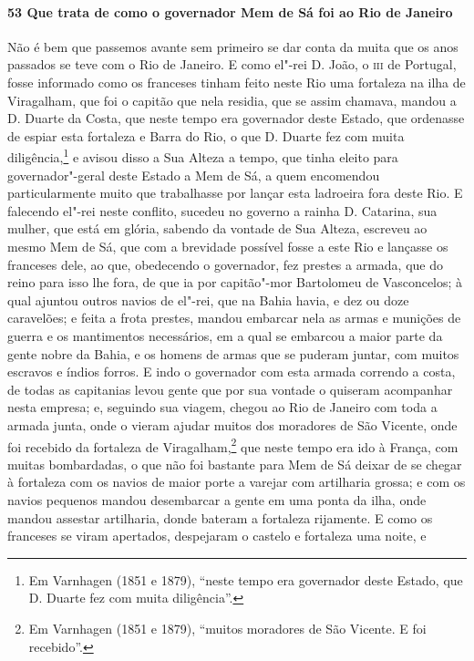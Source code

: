 \begin{linenumbers}
\paragraph{53 Que trata de como o governador Mem de Sá foi ao Rio de Janeiro} \quad
Não é bem que passemos avante sem primeiro se dar conta da muita que os anos passados se
teve com o Rio de Janeiro. E como el"-rei D. João, o \textsc{iii} de Portugal, fosse
informado como os franceses tinham feito neste Rio uma fortaleza na ilha de Viragalham,
que foi o capitão que nela residia, que se assim chamava, mandou a D. Duarte da Costa, que
neste tempo era governador deste Estado, que ordenasse de espiar esta fortaleza e Barra do
Rio, o que D. Duarte fez com muita diligência,\footnote{ Em Varnhagen (1851 e 1879),
``neste tempo era governador deste Estado, que D. Duarte fez com muita diligência''.} e
avisou disso a Sua Alteza a tempo, que tinha eleito para governador"-geral deste Estado a
Mem de Sá, a quem encomendou particularmente muito que trabalhasse por lançar esta
ladroeira fora deste Rio. E falecendo el"-rei neste conflito, sucedeu no governo a rainha
D. Catarina, sua mulher, que está em glória, sabendo da vontade de Sua Alteza, escreveu ao
mesmo Mem de Sá, que com a brevidade possível fosse a este Rio e lançasse os franceses
dele, ao que, obedecendo o governador, fez prestes a armada, que do reino para isso lhe
fora, de que ia por capitão"-mor Bartolomeu de Vasconcelos; à qual ajuntou outros navios de
el"-rei, que na Bahia havia, e dez ou doze caravelões; e feita a frota prestes, mandou
embarcar nela as armas e munições de guerra e os mantimentos necessários, em a qual se
embarcou a maior parte da gente nobre da Bahia, e os homens de armas que se puderam
juntar, com muitos escravos e índios forros. E indo o governador com esta armada correndo
a costa, de todas as capitanias levou gente que por sua vontade o quiseram acompanhar
nesta empresa; e, seguindo sua viagem, chegou ao Rio de Janeiro com toda a armada junta,
onde o vieram ajudar muitos dos moradores de São Vicente, onde foi recebido da fortaleza
de Viragalham,\footnote{ Em Varnhagen (1851 e 1879), ``muitos moradores de São Vicente. E
foi recebido''.} que neste tempo era ido à França, com muitas bombardadas, o que não foi
bastante para Mem de Sá deixar de se chegar à fortaleza com os navios de maior porte a
varejar com artilharia grossa; e com os navios pequenos mandou desembarcar a gente em uma
ponta da ilha, onde mandou assestar artilharia, donde bateram a fortaleza rijamente. E
como os franceses se viram apertados, despejaram o castelo e fortaleza uma noite, e

\end{linenumbers}
